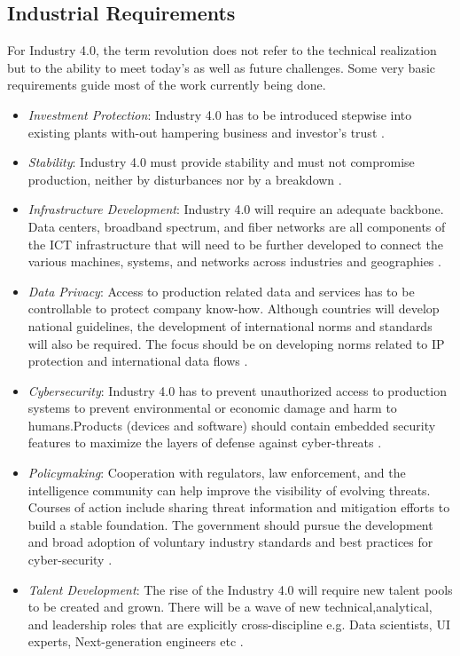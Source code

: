 \subsection{Industrial Requirements}
For Industry 4.0, the term revolution does not refer to the technical realization but to the ability to meet today’s as well as future challenges. Some very basic requirements guide most of the work currently being done.
\begin{itemize}
\item \textit{Investment Protection}: Industry 4.0 has to be introduced stepwise into existing plants with-out hampering business and investor's trust \cite{IN4HYPE,IN4BCG}.
\item \textit{Stability}: Industry 4.0 must provide stability and must not compromise production, neither by disturbances nor by a breakdown \cite{IN4HYPE}.
\item \textit{Infrastructure Development}: Industry 4.0 will require an	adequate backbone. Data centers, broadband spectrum, and fiber networks are all components of the \acs{ICT} infrastructure that will need to be further developed to connect the various machines, systems, and networks across industries and geographies \cite{INDUSINTERNET}.
\item \textit{Data Privacy}: Access to production related data and services has to be controllable to protect company	know-how. Although	countries will develop national guidelines, the development of international norms and	standards will also be required. The focus	should be on developing norms related to IP protection and international data flows \cite{IN4HYPE,INDUSINTERNET}.
\item \textit{Cybersecurity}: Industry 4.0 has to prevent unauthorized access to production systems to prevent environmental or economic damage and harm to humans.Products	(devices and software) should contain embedded security features to maximize the layers of defense against cyber-threats \cite{IN4HYPE,INDUSINTERNET}.
\item \textit{Policymaking}: Cooperation with regulators, law enforcement, and the intelligence community can help improve the visibility of evolving threats. Courses of action include sharing threat information and mitigation efforts to build a stable foundation. The government should pursue the development and broad
adoption of voluntary industry standards and best practices for cyber-security \cite{INDUSINTERNET}.
\item \textit{Talent Development}: The rise of the Industry 4.0 will require new talent pools to be created and grown. There will be a wave of new technical,analytical, and leadership roles that are	explicitly cross-discipline e.g. Data scientists, \acs{UI} experts, Next-generation engineers etc \cite{INDUSINTERNET}.

\end{itemize}
